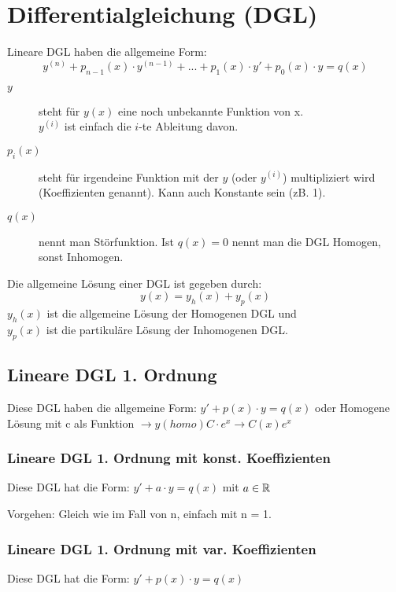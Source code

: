 \section{Differentialgleichung (DGL)}
{\small
Lineare DGL haben die allgemeine Form:
\vspace{-0.2cm}\[
	y^{(n)} + p_{n-1}(x) \cdot y^{(n-1)} + ... + p_1(x) \cdot y' + p_0(x) \cdot y = q(x) 
\]
\begin{description}
	\item [$y$] steht für $y(x)$ eine noch unbekannte Funktion von x.\\
			$y^{(i)}$ ist einfach die $i$-te Ableitung davon.

	\item [$p_i(x)$] steht für irgendeine Funktion mit der $y$ (oder $y^{(i)}$) multipliziert wird (Koeffizienten genannt). Kann auch Konstante sein (zB. 1).

	\item [$q(x)$] nennt man Störfunktion. Ist $q(x) = 0$ nennt man die DGL Homogen, sonst Inhomogen.
\end{description}

Die allgemeine Lösung einer DGL ist gegeben durch:
\vspace{-0.2cm}\[
	y(x) = y_h(x) + y_p(x)
\]
$y_h(x)$ ist die allgemeine Lösung der Homogenen DGL und\\
$y_p(x)$ ist die partikuläre Lösung der Inhomogenen DGL.
}

\subsection{Lineare DGL 1. Ordnung}
\vspace{-0.1cm}Diese DGL haben die allgemeine Form: $y' + p(x) \cdot y = q(x)$ \small {oder Homogene Lösung mit c als Funktion
$\rightarrow  y(homo)C\cdot e^x \rightarrow C(x)e^x$}

\subsubsection[Konst. Koeffizient]{Lineare DGL 1. Ordnung mit konst. Koeffizienten}
\vspace{-0.1cm}Diese DGL hat die Form: $y' + a \cdot y = q(x)$ mit $a \in \mathbb{R}$

Vorgehen: Gleich wie im Fall von n, einfach mit n = 1.

\subsubsection[Variabler Koeffizient]{Lineare DGL 1. Ordnung mit var. Koeffizienten}
Diese DGL hat die Form: $y' + p(x) \cdot y = q(x)$

